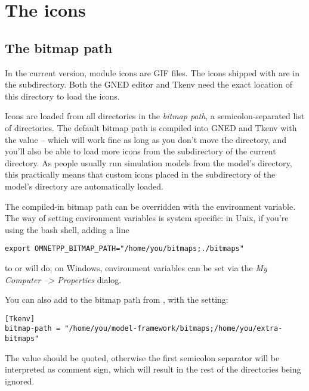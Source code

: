 \section{The icons}
\label{sec:ch-graphics:icon-library}

\subsection{The bitmap path}

In the current {\opp} version, module icons are GIF files. The icons shipped
with {\opp} are in the  subdirectory. Both the GNED editor
and Tkenv need the exact location of this directory to load the icons.

Icons are loaded from all directories in the \textit{bitmap path},
a semicolon-separated list of directories.
The default bitmap path is compiled into GNED and Tkenv with the value
 -- which will work fine
as long as you don't move the directory, and you'll also be able to
load more icons from the  subdirectory of the current
directory. As people usually run simulation models from the model's
directory, this practically means that custom icons placed in the
 subdirectory of the model's directory are automatically
loaded.

The compiled-in bitmap path can be overridden with the 
environment variable. The way of setting environment variables is system
specific: in Unix, if you're using the bash shell, adding a line

\begin{verbatim}
export OMNETPP_BITMAP_PATH="/home/you/bitmaps;./bitmaps"
\end{verbatim}

to  or  will do; on Windows, environment variables
can be set via the \textit{My Computer --> Properties} dialog.

You can also add to the bitmap path from , with
the  setting:

\begin{verbatim}
[Tkenv]
bitmap-path = "/home/you/model-framework/bitmaps;/home/you/extra-bitmaps"
\end{verbatim}

The value should be quoted, otherwise the first semicolon separator will be
interpreted as comment sign, which will result in the rest of the
directories being ignored.


